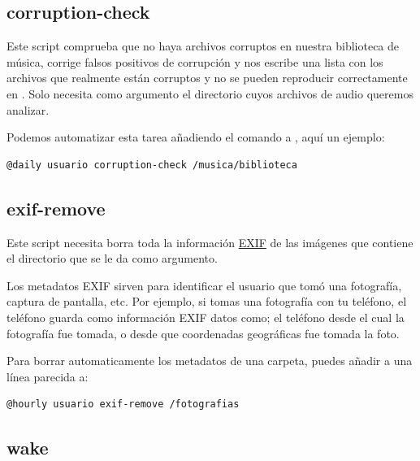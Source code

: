 \documentclass[11pt]{article}
\begin{document}
\subsection{corruption-check}

Este script comprueba que no haya archivos corruptos en nuestra biblioteca de música, corrige falsos positivos de corrupción y nos escribe una lista con los archivos que realmente están corruptos y no se pueden reproducir correctamente en . Solo necesita como argumento el directorio cuyos archivos de audio queremos analizar.

\vspace{5pt}

Podemos automatizar esta tarea añadiendo el comando a , aquí un ejemplo:

\begin{verbatim}
@daily usuario corruption-check /musica/biblioteca
\end{verbatim}

\subsection{exif-remove}

Este script necesita borra toda la información \href{https://en.wikipedia.org/wiki/Exif}{EXIF} de las imágenes que contiene el directorio que se le da como argumento.

\vspace{5pt}

Los metadatos EXIF sirven para identificar el usuario que tomó una fotografía, captura de pantalla, etc. Por ejemplo, si tomas una fotografía con tu teléfono, el teléfono guarda como información EXIF datos como; el teléfono desde el cual la fotografía fue tomada, o desde que coordenadas geográficas fue tomada la foto.

\vspace{5pt}

Para borrar automaticamente los metadatos de una carpeta, puedes añadir a  una línea parecida a:

\begin{verbatim}
@hourly usuario exif-remove /fotografias
\end{verbatim}

\subsection{wake}
\end{document}
